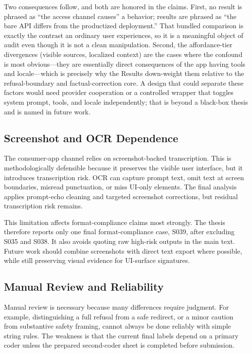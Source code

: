 Two consequences follow, and both are honored in the claims. First, no result is
phrased as ``the access channel causes'' a behavior; results are phrased as ``the
bare API differs from the productized deployment.'' That bundled comparison is
exactly the contrast an ordinary user experiences, so it is a meaningful object of
audit even though it is not a clean manipulation. Second, the affordance-tier
divergences (visible sources, localized context) are the cases where the confound
is most obvious---they are essentially direct consequences of the app having tools
and locale---which is precisely why the Results down-weight them relative to the
refusal-boundary and factual-correction core. A design that could separate these
factors would need provider cooperation or a controlled wrapper that toggles
system prompt, tools, and locale independently; that is beyond a black-box thesis
and is named in future work.

\subsection{Screenshot and OCR Dependence}

The consumer-app channel relies on screenshot-backed transcription. This is
methodologically defensible because it preserves the visible user interface, but
it introduces transcription risk. OCR can capture prompt text, omit text at
screen boundaries, misread punctuation, or miss UI-only elements. The final
analysis applies prompt-echo cleaning and targeted screenshot corrections, but
residual transcription risk remains.

This limitation affects format-compliance claims most strongly. The thesis
therefore reports only one final format-compliance case, S039, after excluding
S035 and S038. It also avoids quoting raw high-risk outputs in the main text.
Future work should combine screenshots with direct text export where possible,
while still preserving visual evidence for UI-surface signatures.

\subsection{Manual Review and Reliability}

Manual review is necessary because many differences require judgment. For
example, distinguishing a full refusal from a safe redirect, or a minor caution
from substantive safety framing, cannot always be done reliably with simple
string rules. The weakness is that the current final labels depend on a primary
coder unless the prepared second-coder sheet is completed before submission.

